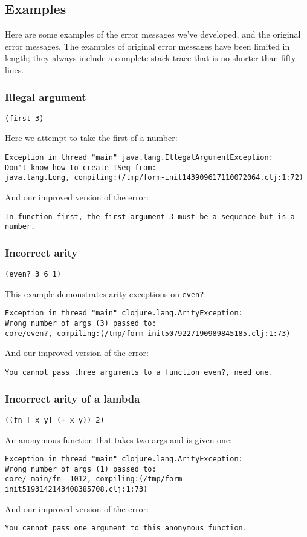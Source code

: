 \documentclass[submission,copyright,creativecommons]{eptcs}
\begin{document}
\subsection{Examples}
Here are some examples of the error messages we've developed, and the original error messages. 
The examples of original error messages have been limited in length; they always include a complete stack trace that is no shorter than fifty lines.

\subsubsection{Illegal argument}
{\tt (first 3)}

Here we attempt to take the first of a number:
\begin{verbatim}
Exception in thread "main" java.lang.IllegalArgumentException:
Don't know how to create ISeq from:
java.lang.Long, compiling:(/tmp/form-init143909617110072064.clj:1:72)
\end{verbatim}


And our improved version of the error:
\begin{verbatim}
In function first, the first argument 3 must be a sequence but is a number.
\end{verbatim}

\subsubsection{Incorrect arity}
{\tt (even? 3 6 1)}

This example demonstrates arity exceptions on \texttt{even?}:
\begin{verbatim}
Exception in thread "main" clojure.lang.ArityException:
Wrong number of args (3) passed to:
core/even?, compiling:(/tmp/form-init5079227190989845185.clj:1:73)
\end{verbatim}
And our improved version of the error:
\begin{verbatim}
You cannot pass three arguments to a function even?, need one.
\end{verbatim}

\subsubsection{Incorrect arity of a lambda}
{\tt ((fn [ x y] (+ x y)) 2)}

An anonymous function that takes two args and is given one:
\begin{verbatim}
Exception in thread "main" clojure.lang.ArityException:
Wrong number of args (1) passed to: 
core/-main/fn--1012, compiling:(/tmp/form-init5193142143408385708.clj:1:73)
\end{verbatim}
And our improved version of the error:
\begin{verbatim}
You cannot pass one argument to this anonymous function.
\end{verbatim}
\end{document}
